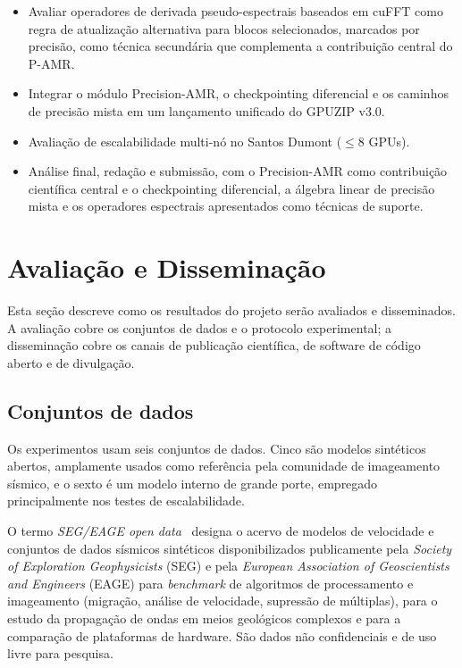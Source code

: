 \documentclass[12pt,a4paper]{article}
\newcommand{\pamr}{P\nobreakdash-AMR}
\begin{document}
\begin{itemize}
  \item Avaliar operadores de derivada pseudo-espectrais baseados em cuFFT
        como regra de atualização alternativa para blocos selecionados,
        marcados por precisão, como técnica secundária que complementa a
        contribuição central do \pamr{}.
  \item Integrar o módulo Precision-AMR, o checkpointing diferencial e os
        caminhos de precisão mista em um lançamento unificado do GPUZIP v3.0.
  \item Avaliação de escalabilidade multi-nó no Santos Dumont
        ($\leq$8 GPUs).
  \item Análise final, redação e submissão, com o Precision-AMR como
        contribuição científica central e o checkpointing diferencial, a
        álgebra linear de precisão mista e os operadores espectrais
        apresentados como técnicas de suporte.
\end{itemize}

\fi

\section{Avaliação e Disseminação}

Esta seção descreve como os resultados do projeto serão avaliados e
disseminados. A avaliação cobre os conjuntos de dados e o protocolo
experimental; a disseminação cobre os canais de publicação científica, de
software de código aberto e de divulgação.

\subsection{Conjuntos de dados}

Os experimentos usam seis conjuntos de dados. Cinco são modelos sintéticos
abertos, amplamente usados como referência pela comunidade de imageamento
sísmico, e o sexto é um modelo interno de grande porte, empregado
principalmente nos testes de escalabilidade.

O termo \emph{SEG/EAGE open data}~\cite{segopendata} designa o acervo de
modelos de velocidade e conjuntos de dados sísmicos sintéticos
disponibilizados publicamente pela \emph{Society of Exploration
Geophysicists} (SEG) e pela \emph{European Association of Geoscientists and
Engineers} (EAGE) para \emph{benchmark} de algoritmos de processamento e
imageamento (migração, análise de velocidade, supressão de múltiplas), para
o estudo da propagação de ondas em meios geológicos complexos e para a
comparação de plataformas de hardware. São dados não confidenciais e de uso
livre para pesquisa.
\end{document}
